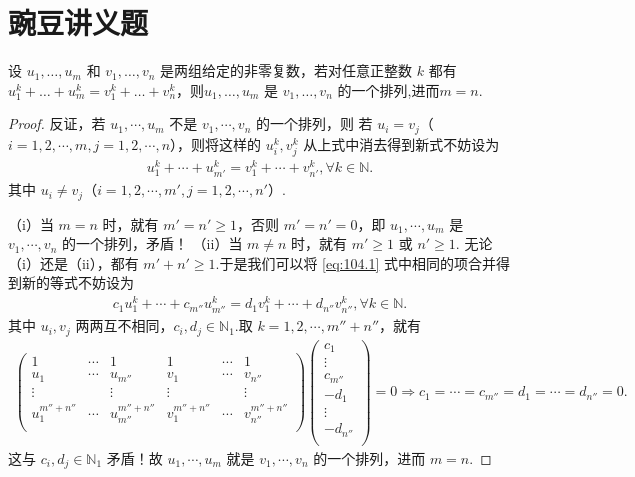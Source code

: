 \documentclass[../../main.tex]{subfiles}
\begin{document}
\section{豌豆讲义题}

\begin{lemma}\label{lemma:引理1564561}
设 $u_1,\dots,u_m$ 和 $v_1,\dots,v_n$ 是两组给定的非零复数，若对任意正整数 $k$ 都有 $u_1^k+\dots+u_m^k=v_1^k+\dots+v_n^k$，则$u_1,\dots,u_m$ 是 $v_1,\dots,v_n$ 的一个排列,进而$m=n$.
\end{lemma}
\begin{proof}
反证，若 $u_1,\cdots ,u_m$ 不是 $v_1,\cdots ,v_n$ 的一个排列，则
若 $u_i=v_j$（$i=1,2,\cdots ,m,j=1,2,\cdots ,n$），则将这样的 $u_{i}^{k},v_{j}^{k}$ 从上式中消去得到新式不妨设为
\begin{align}
u_{1}^{k}+\cdots +u_{m'}^{k}=v_{1}^{k}+\cdots +v_{n'}^{k},\forall k\in \mathbb{N} .\label{eq:104.1}
\end{align}
其中 $u_i\ne v_j$（$i=1,2,\cdots ,m',j=1,2,\cdots ,n'$）.

（i）当 $m=n$ 时，就有 $m' =n' \geqslant 1$，否则 $m' =n' =0$，即 $u_1,\cdots ,u_m$ 是 $v_1,\cdots ,v_n$ 的一个排列，矛盾！
（ii）当 $m\ne n$ 时，就有 $m' \geqslant 1$ 或 $n' \geqslant 1$.
无论（i）还是（ii），都有 $m' +n' \geqslant 1$.于是我们可以将 \eqref{eq:104.1} 式中相同的项合并得到新的等式不妨设为
\begin{align*}
c_1u_{1}^{k}+\cdots +c_{m''}u_{m''}^{k}=d_1v_{1}^{k}+\cdots +d_{n''}v_{n''}^{k},\forall k\in \mathbb{N} .
\end{align*}
其中 $u_i,v_j$ 两两互不相同，$c_i,d_j\in \mathbb{N} _1$.取 $k=1,2,\cdots ,m'' +n''$，就有
\begin{align*}
\begin{pmatrix}
1&		\cdots&		1&		1&		\cdots&		1\\
u_1&		\cdots&		u_{m''}&		v_1&		\cdots&		v_{n''}\\
\vdots&		&		\vdots&		\vdots&		&		\vdots\\
u_{1}^{m'' +n''}&		\cdots&		u_{m''}^{m'' +n''}&		v_{1}^{m'' +n''}&		\cdots&		v_{n''}^{m'' +n''}\\
\end{pmatrix} \begin{pmatrix}
c_1\\
\vdots\\
c_{m''}\\
-d_1\\
\vdots\\
-d_{n''}\\
\end{pmatrix} =0\Rightarrow c_1=\cdots =c_{m''}=d_1=\cdots =d_{n''}=0.
\end{align*}
这与 $c_i,d_j\in \mathbb{N} _1$ 矛盾！故 $u_1,\cdots ,u_m$ 就是 $v_1,\cdots ,v_n$ 的一个排列，进而 $m=n$.

\end{proof}
\end{document}
